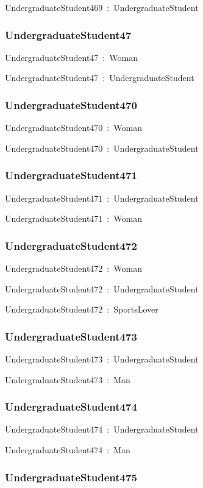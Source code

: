 \documentclass{article}
\begin{document}
UndergraduateStudent469~:~UndergraduateStudent

\subsubsection*{UndergraduateStudent47}

UndergraduateStudent47~:~Woman

UndergraduateStudent47~:~UndergraduateStudent

\subsubsection*{UndergraduateStudent470}

UndergraduateStudent470~:~Woman

UndergraduateStudent470~:~UndergraduateStudent

\subsubsection*{UndergraduateStudent471}

UndergraduateStudent471~:~UndergraduateStudent

UndergraduateStudent471~:~Woman

\subsubsection*{UndergraduateStudent472}

UndergraduateStudent472~:~Woman

UndergraduateStudent472~:~UndergraduateStudent

UndergraduateStudent472~:~SportsLover

\subsubsection*{UndergraduateStudent473}

UndergraduateStudent473~:~UndergraduateStudent

UndergraduateStudent473~:~Man

\subsubsection*{UndergraduateStudent474}

UndergraduateStudent474~:~UndergraduateStudent

UndergraduateStudent474~:~Man

\subsubsection*{UndergraduateStudent475}
\end{document}
